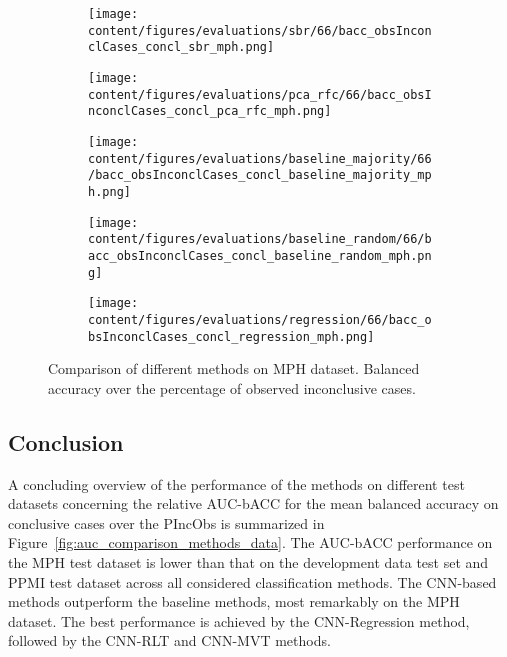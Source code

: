 \begin{figure}[ht]
  \begin{subfigure}{0.45\textwidth}
    \centering
    \texttt{[image: content/figures/evaluations/sbr/66/bacc\_obsInconclCases\_concl\_sbr\_mph.png]}
  \end{subfigure}
  \hfill
  \begin{subfigure}{0.45\textwidth}
    \centering
    \texttt{[image: content/figures/evaluations/pca\_rfc/66/bacc\_obsInconclCases\_concl\_pca\_rfc\_mph.png]}
  \end{subfigure}
  \hfill
  \begin{subfigure}{0.45\textwidth}
    \centering
    \texttt{[image: content/figures/evaluations/baseline\_majority/66/bacc\_obsInconclCases\_concl\_baseline\_majority\_mph.png]}
  \end{subfigure}
  \hfill
  \begin{subfigure}{0.45\textwidth}
    \centering
    \texttt{[image: content/figures/evaluations/baseline\_random/66/bacc\_obsInconclCases\_concl\_baseline\_random\_mph.png]}
  \end{subfigure}
  \hfill
  \begin{subfigure}{0.45\textwidth}
    \centering
    \texttt{[image: content/figures/evaluations/regression/66/bacc\_obsInconclCases\_concl\_regression\_mph.png]}
  \end{subfigure}

  \caption{Comparison of different methods on MPH dataset.
  Balanced accuracy over the percentage of observed inconclusive cases.}
  \label{fig:test_mph}
\end{figure}


\subsection{Conclusion}

A concluding overview of the performance of the methods on different test datasets 
concerning the relative AUC-bACC for the mean balanced accuracy on conclusive cases over the PIncObs 
is summarized in Figure~\ref{fig:auc_comparison_methods_data}.
The AUC-bACC performance on the MPH test dataset is lower than that on the development data test set and PPMI test dataset 
across all considered classification methods.
The CNN-based methods outperform the baseline methods, most remarkably on the MPH dataset.
The best performance is achieved by the CNN-Regression method, followed by the CNN-RLT and CNN-MVT methods.


